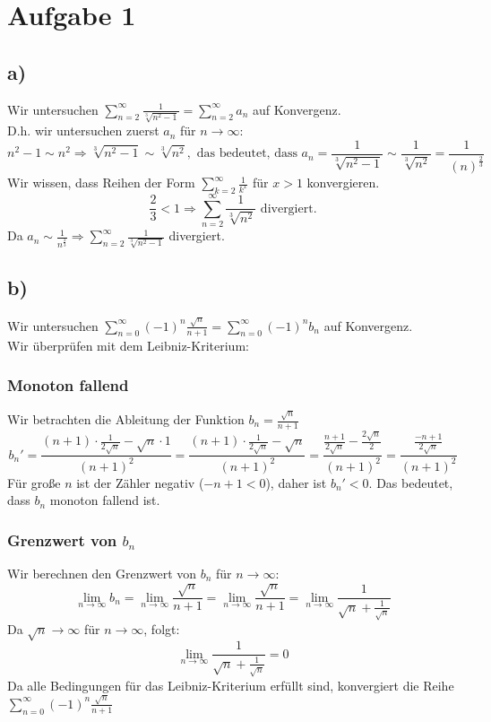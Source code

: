 \section{Aufgabe 1}
    \subsection{a)} 
         Wir untersuchen $\sum_{n=2}^{\infty}\frac{1}{\sqrt[3]{n^2-1}}=\sum_{n=2}^{\infty}a_n$ auf Konvergenz. \\
         D.h. wir untersuchen zuerst $a_n$ für $n \to \infty$:
         $$n^2-1 \sim n^2 \Rightarrow \sqrt[3]{n^2-1} \sim \sqrt[3]{n^2}, \text{ das bedeutet, dass } a_n=\frac{1}{\sqrt[3]{n^2-1}} \sim \frac{1}{\sqrt[3]{n^2}}=\frac{1}{(n)^{\frac{2}{3}}}$$
         Wir wissen, dass Reihen der Form $\sum_{k=2}^{\infty}\frac{1}{k^x}$ für $x>1$ konvergieren. \\
         $$\frac{2}{3}<1 \Rightarrow \sum_{n=2}^{\infty}\frac{1}{\sqrt[3]{n^2}} \text{ divergiert.}$$
         Da $a_n \sim \frac{1}{n^{\frac{2}{3}}} \Rightarrow \sum_{n=2}^{\infty}\frac{1}{\sqrt[3]{n^2-1}}$ divergiert.

    \subsection{b)}
        Wir untersuchen $\sum_{n=0}^{\infty} (-1)^n \frac{\sqrt{n}}{n+1} = \sum_{n=0}^{\infty}(-1)^nb_n$ auf Konvergenz. \\
        Wir überprüfen mit dem Leibniz-Kriterium:
        \subsubsection{Monoton fallend}
        Wir betrachten die Ableitung der Funktion $b_n = \frac{\sqrt{n}}{n+1}$ \\
        $$
        b_n' = \frac{(n+1) \cdot \frac{1}{2\sqrt{n}} - \sqrt{n} \cdot 1}{(n+1)^2} = \frac{(n+1) \cdot \frac{1}{2\sqrt{n}} - \sqrt{n}}{(n+1)^2} = \frac{\frac{n+1}{2\sqrt{n}} - \frac{2\sqrt{n}}{2}}{(n+1)^2} = \frac{\frac{-n + 1}{2\sqrt{n}}}{(n+1)^2}
        $$
        Für große \( n \) ist der Zähler negativ (\( -n + 1 < 0 \)), daher ist \( b_n' < 0 \). Das bedeutet, dass \( b_n \) monoton fallend ist.
        
        \subsubsection{Grenzwert von \( b_n \)}
        Wir berechnen den Grenzwert von \( b_n \) für \( n \to \infty \):
        \[
        \lim_{n \to \infty} b_n = \lim_{n \to \infty} \frac{\sqrt{n}}{n+1}=  \lim_{n \to \infty} \frac{\sqrt{n}}{n+1} = \lim_{n \to \infty} \frac{1}{\sqrt{n} + \frac{1}{\sqrt{n}}}
        \]
        Da \( \sqrt{n} \to \infty \) für \( n \to \infty \), folgt:
        \[
        \lim_{n \to \infty} \frac{1}{\sqrt{n} + \frac{1}{\sqrt{n}}} = 0
        \]
        Da alle Bedingungen für das Leibniz-Kriterium erfüllt sind, konvergiert die Reihe $\sum_{n=0}^{\infty} (-1)^n \frac{\sqrt{n}}{n+1}$        

